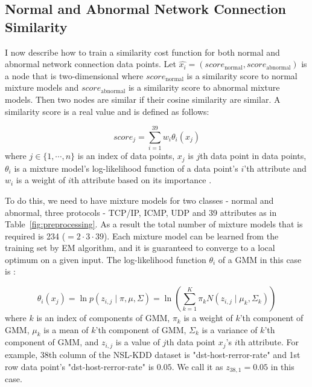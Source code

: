 \subsection{Normal and Abnormal Network Connection Similarity}
\label{subsec:normalabnormalsimilarity}
I now describe how to train a similarity cost function for both normal and abnormal network connection data points. 
Let $\hat{x_i} = (score_{\text{normal}}, score_{\text{abnormal}})$ is a node that is two-dimensional 
where $score_{\text{normal}}$ is a similarity score to normal mixture models 
and $score_{\text{abnormal}}$ is a similarity score to abnormal mixture models. 
Then two nodes are similar if their cosine similarity are similar. 
A similarity score is a real value and is defined as follows:

\begin{equation}
    score_j = \sum_{i=1}^{39} w_i \theta_i (x_j) 
\end{equation}
where $j \in \{1,\cdots,n\}$ is an index of data points, $x_j$ is $j$th data point in data points, $\theta_i$ is a mixture model's log-likelihood function of a data point's $i$'th attribute and $w_i$ is a weight of $i$th attribute based on its importance \cite{kayacik05}. 

To do this, we need to have mixture models for two classes - normal and abnormal, three protocols - TCP/IP, ICMP, UDP and 39 attributes as in Table~\ref{fig:preprocessing}. 
As a result the total number of mixture models that is required is 234 ($= 2 \cdot 3 \cdot 39$).
Each mixture model can be learned from the training set by EM algorithm, and it is guaranteed to converge to a local optimum on a given input. 
The log-likelihood function $\theta_i$ of a GMM in this case is :

\begin{equation}
    \theta_i(x_j) = \ln p(z_{i,j} \mid \pi, \mu, \Sigma) = \ln (\sum_{k=1}^K \pi_k N(z_{i,j} \mid \mu_k, \Sigma_k))
\end{equation}
where $k$ is an index of components of GMM, 
$\pi_k$ is a weight of $k$'th component of GMM, 
$\mu_k$ is a mean of $k$'th component of GMM, 
$\Sigma_k$ is a variance of $k$'th component of GMM, 
and $z_{i,j}$ is a value of $j$th data point $x_j$'s $i$th attribute. 
For example, 38th column of the NSL-KDD dataset is "dst-host-rerror-rate" and 1st row data point's "dst-host-rerror-rate" is $0.05$. 
We call it as $z_{38,1} = 0.05$ in this case. 

